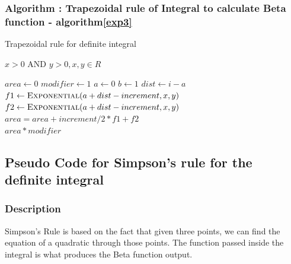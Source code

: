 \documentclass[letterpaper, 11pt]{article}
\begin{document}
            \subsubsection{Algorithm : Trapezoidal rule of Integral to calculate Beta function - algorithm\ref{exp3}}
                \begin{algorithm}
                    \caption{Trapezoidal rule for definite integral}\label{exp3}
                    \begin{algorithmic}[1]
                        \Require $x > 0$ AND $y > 0, x, y \in R$
                        
                        \State $area\gets 0$
                        \State $modifier\gets 1$
                        \State $a\gets 0$
                        \State $b\gets 1$
                             
                                \State $dist \gets i - a$
                                \State $f1 \gets \Call{Exponential}{a + dist - increment, x,y}$
                                \State $f2 \gets \Call {Exponential}{a + dist - increment, x,y}$
                                \State $area = area + increment/2  * f1 + f2$ 
                            \EndFor \\
                        \Return $area * modifier$
                        \EndFunction
                    \end{algorithmic}
                \end{algorithm}
    \newpage       
    \subsection{Pseudo Code for Simpson's rule for the definite integral}
            \subsubsection{Description}
                Simpson's Rule is based on the fact that given three points, we can find the equation of a quadratic through those points. The function passed inside the integral is what produces the Beta function output.
\end{document}

